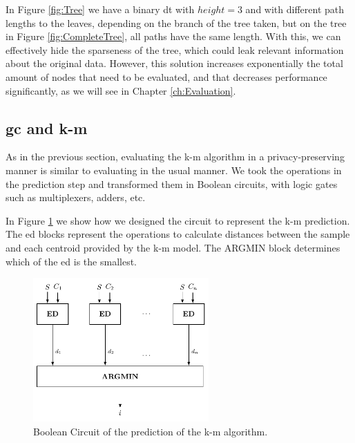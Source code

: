 In Figure \ref{fig:Tree} we have a binary \ac{dt} with $height=3$ and with different path lengths to the leaves, depending on the branch of the tree taken, but on the tree in Figure \ref{fig:CompleteTree}, all paths have the same length. With this, we can effectively hide the sparseness of the tree, which could leak relevant information about the original data. However, this solution increases exponentially the total amount of nodes that need to be evaluated, and that decreases performance significantly, as we will see in Chapter \ref{ch:Evaluation}.
                


\subsection{\acl{gc} and \acl{k-m}}
\label{ssec:GCandk-M}



As in the previous section, evaluating the \ac{k-m} algorithm in a privacy-preserving manner is similar to evaluating in the usual manner. We took the operations in the prediction step and transformed them in Boolean circuits, with logic gates such as multiplexers, adders, etc.

In Figure \ref{fig:kmeans} we show how we designed the circuit to represent the \ac{k-m} prediction. The \ac{ed} blocks represent the operations to calculate distances between the sample and each centroid provided by the \ac{k-m} model. The ARGMIN block determines which of the \ac{ed} is the smallest.


\begin{figure}[ht]
  \centering
  \includegraphics[width=0.60\textwidth]{images/k-means.pdf}
  \caption{Boolean Circuit of the prediction of the \ac{k-m} algorithm.}
  \label{fig:kmeans}
\end{figure}


